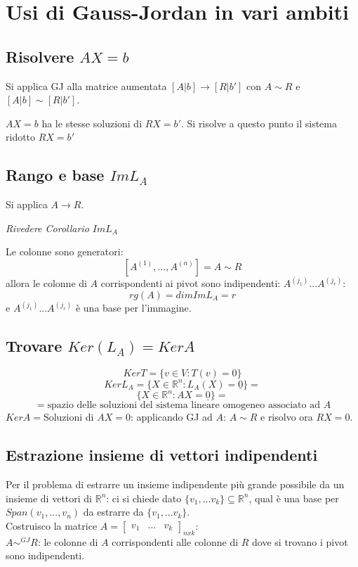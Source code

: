 \section{Usi di Gauss-Jordan in vari ambiti}
\subsection{Risolvere $AX=b$}
Si applica GJ alla matrice aumentata $[A|b]\rightarrow[R|b']$ con $A\sim R$ e $[A|b]\sim[R|b']$.

$AX=b$ ha le stesse soluzioni di $RX=b'$. Si risolve a questo punto il sistema ridotto $RX=b'$

\subsection{Rango e base $ImL_A$}
Si applica $A\rightarrow R$.

\textit{Rivedere Corollario $ImL_A$}

Le colonne sono generatori:
\[[A^{(1)},...,A^{(n)}]=A\sim R\]
allora le colonne di $A$ corrispondenti ai pivot sono indipendenti: $A^{(j_1)}...A^{(j_r)}$:
\[rg(A)=dimImL_A=r\]
e $A^{(j_1)}...A^{(j_r)}$ è una base per l'immagine.

\subsection{Trovare $Ker(L_A)=KerA$}
\[KerT=\{v\in V:T(v)=0\}\]
\[KerL_A=\{X\in\mathbb{R}^n:L_A(X)=\underline{0}\}=\]
\[\{X\in\mathbb{R}^n:AX=\underline{0}\}=\]
\[=\text{spazio delle soluzioni del sistema lineare omogeneo associato ad } A\]
$KerA=$Soluzioni di $AX=0$: applicando GJ ad $A$: $A\sim R$ e risolvo ora $RX=0$.

\subsection{Estrazione insieme di vettori indipendenti}
Per il problema di estrarre un insieme indipendente più grande possibile da un insieme di vettori di $\mathbb{R}^n$: ci si chiede dato $\{v_1,...v_k\}\subseteq\mathbb{R}^n$, qual è una base per $Span(v_1,...,v_n)$ da estrarre da $\{v_1,...v_k\}$.
\\Costruisco la matrice $A=\begin{bmatrix}v_1&\dots&v_k\end{bmatrix}_{nxk}$:
\\$A\sim^{GJ}R$: le colonne di $A$ corrispondenti alle colonne di $R$ dove si trovano i pivot sono indipendenti.

